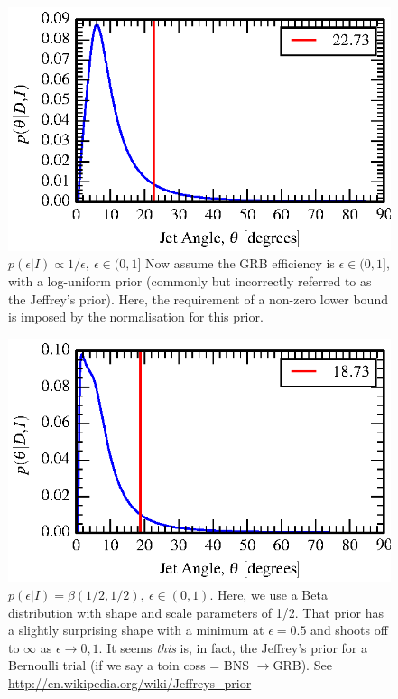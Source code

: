 \documentclass[twocolumn,nofootinbib]{revtex4-1}
\begin{document}
\begin{figure}[h!]
\includegraphics{iLIGO/jet_angle_posterior_s6UL_TEST_logEffPrior-0.01-1.eps}
\caption{$p(\epsilon|I) \propto 1/\epsilon,~\epsilon \in (0,1]$
Now assume the GRB efficiency is $\epsilon \in (0,1]$, with a log-uniform
prior (commonly but incorrectly referred to as the Jeffrey's prior).  Here, the
requirement of a non-zero lower bound is imposed by the normalisation for this
prior.
}
\end{figure}

\begin{figure}[h!]
\includegraphics{iLIGO/jet_angle_posterior_s6UL_TEST_bernoEffPrior.eps}
\caption{$p(\epsilon|I) = \beta(1/2,1/2),~\epsilon \in (0,1)$.  Here, we use a
Beta distribution with shape and scale parameters of 1/2.  That prior has a
slightly surprising shape with a minimum at $\epsilon=0.5$ and shoots off to
$\infty$ as $\epsilon\rightarrow 0,1$.  It seems \emph{this} is, in fact, the
Jeffrey's prior for a Bernoulli trial (if we say a toin coss = BNS
$\rightarrow$GRB). See
\href{http://en.wikipedia.org/wiki/Jeffreys_prior}{http://en.wikipedia.org/wiki/Jeffreys\_prior}
}
\end{figure}
\end{document}
